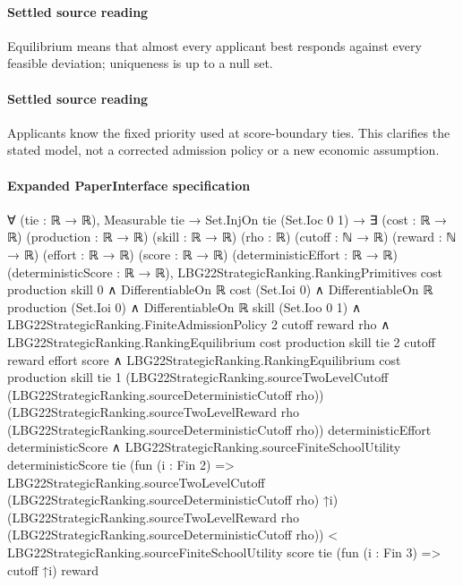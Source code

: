 \documentclass[10pt]{article}
\begin{document}
\paragraph{Settled source reading}
\begin{sloppypar}
Equilibrium means that almost every applicant best responds against every feasible deviation;\allowbreak{} uniqueness is up to a null set.\allowbreak{}
\end{sloppypar}
\paragraph{Settled source reading}
\begin{sloppypar}
Applicants know the fixed priority used at score-\allowbreak{}boundary ties.\allowbreak{} This clarifies the stated model, not a corrected admission policy or a new economic assumption.\allowbreak{}
\end{sloppypar}

\paragraph{Expanded PaperInterface specification}
\begin{ReviewVerbatim}
∀ (tie : ℝ → ℝ),
  Measurable tie →
    Set.InjOn tie (Set.Ioc 0 1) →
      ∃ (cost : ℝ → ℝ) (production : ℝ → ℝ) (skill : ℝ → ℝ) (rho : ℝ) (cutoff : ℕ → ℝ) (reward : ℕ → ℝ) (effort : ℝ → ℝ)
        (score : ℝ → ℝ) (deterministicEffort : ℝ → ℝ) (deterministicScore : ℝ → ℝ),
        LBG22StrategicRanking.RankingPrimitives cost production skill 0 ∧
          DifferentiableOn ℝ cost (Set.Ioi 0) ∧
            DifferentiableOn ℝ production (Set.Ioi 0) ∧
              DifferentiableOn ℝ skill (Set.Ioo 0 1) ∧
                LBG22StrategicRanking.FiniteAdmissionPolicy 2 cutoff reward rho ∧
                  LBG22StrategicRanking.RankingEquilibrium cost production skill tie 2 cutoff reward effort score ∧
                    LBG22StrategicRanking.RankingEquilibrium cost production skill tie 1
                        (LBG22StrategicRanking.sourceTwoLevelCutoff
                          (LBG22StrategicRanking.sourceDeterministicCutoff rho))
                        (LBG22StrategicRanking.sourceTwoLevelReward rho
                          (LBG22StrategicRanking.sourceDeterministicCutoff rho))
                        deterministicEffort deterministicScore ∧
                      LBG22StrategicRanking.sourceFiniteSchoolUtility deterministicScore tie
                          (fun (i : Fin 2) =>
                            LBG22StrategicRanking.sourceTwoLevelCutoff
                              (LBG22StrategicRanking.sourceDeterministicCutoff rho) ↑i)
                          (LBG22StrategicRanking.sourceTwoLevelReward rho
                            (LBG22StrategicRanking.sourceDeterministicCutoff rho)) <
                        LBG22StrategicRanking.sourceFiniteSchoolUtility score tie (fun (i : Fin 3) => cutoff ↑i) reward
\end{ReviewVerbatim}
\end{document}
